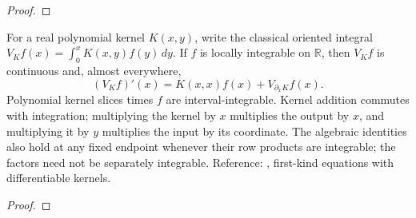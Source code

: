 \begin{supporting}
\begin{theorem}
\end{theorem}
\begin{proof}
\leanok
\end{proof}



\begin{theorem}
\label{thm:volterra-polynomial-differentiation}
\leanok
For a real polynomial kernel $K(x,y)$, write the classical oriented integral
$V_K f(x)=\int_0^xK(x,y)f(y)\,dy$. If $f$ is locally integrable on $\mathbb R$,
then $V_K f$ is continuous and, almost everywhere,
\[
 (V_K f)'(x)=K(x,x)f(x)+V_{\partial_x K}f(x).
\]
Polynomial kernel slices times $f$ are interval-integrable. Kernel addition
commutes with integration; multiplying the kernel by $x$ multiplies the output
by $x$, and multiplying it by $y$ multiplies the input by its coordinate.
The algebraic identities also hold at any fixed endpoint whenever their
row products are integrable; the factors need not be separately integrable.
Reference: \cite{linz-volterra}, first-kind equations with differentiable kernels.
\end{theorem}
\begin{proof}
\leanok
\end{proof}
\end{supporting}


